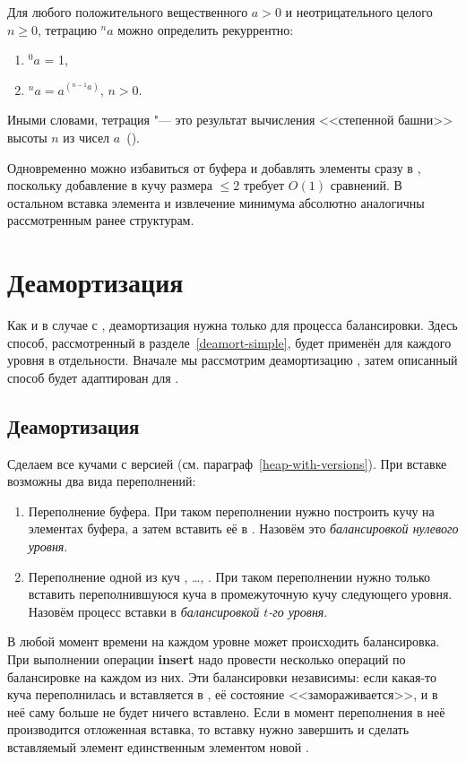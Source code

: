 \begin{definition}
Для любого положительного вещественного $a > 0$ и неотрицательного целого $n \geq 0$,
тетрацию ${}^na$ можно определить рекуррентно:
\begin{enumerate}
\item ${}^0a$ = 1,
\item ${}^na = a^{({}^{n-1}a)}$, $n > 0$.
\end{enumerate}
Иными словами, тетрация "--- это результат вычисления <<степенной башни>> высоты $n$
из чисел $a$~(\cite{tetration}).
\end{definition}

Одновременно можно избавиться от буфера и добавлять элементы сразу в \MH[1], поскольку
добавление в кучу размера $\leq 2$ требует $O(1)$ сравнений. В остальном
вставка элемента и извлечение минимума абсолютно аналогичны рассмотренным ранее структурам.

\section{Деамортизация}
Как и в случае с \SCH, деамортизация нужна только для процесса балансировки.
Здесь способ, рассмотренный в разделе~\ref{deamort-simple}, будет применён для
каждого уровня в отдельности. Вначале мы рассмотрим деамортизацию \CH[r],
затем описанный способ будет адаптирован для \CH[*].

\subsection{Деамортизация \CH[r]}
Сделаем все \MH[t] кучами с версией (см. параграф~\ref{heap-with-versions}).
При вставке возможны два вида переполнений:
\begin{enumerate}
\item Переполнение буфера. При таком переполнении нужно построить кучу на элементах
    буфера, а затем вставить её в \MH[1]. Назовём это \emph{балансировкой нулевого уровня}.
\item Переполнение одной из куч \MH[1], \dots, \MH[r-1]. При таком переполнении
    нужно только вставить переполнившуюся куча в промежуточную кучу следующего
    уровня. Назовём процесс вставки \MH[t] в \MH[t+1] \emph{балансировкой $t$-го уровня}.
\end{enumerate}

В любой момент времени на каждом уровне может происходить балансировка. При выполнении
операции \textbf{insert} надо провести несколько операций по балансировке на каждом из них.
Эти балансировки независимы: если какая-то куча \MH[t] переполнилась и вставляется
в \MH[t+1], её состояние <<замораживается>>, и в неё саму больше не будет ничего вставлено.
Если в момент переполнения \MH[t] в неё производится отложенная вставка,
то вставку нужно завершить и сделать вставляемый элемент единственным
элементом новой \MH[t].

